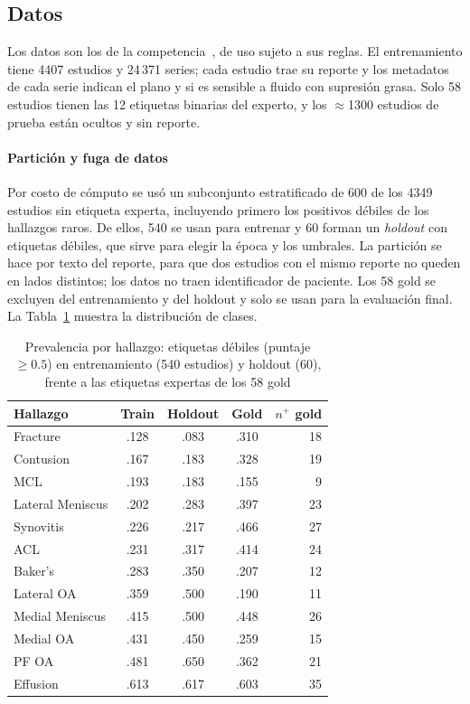 \documentclass[conference]{IEEEtran}
\begin{document}
\subsection{Datos}
\label{sec:datos}

Los datos son los de la competencia~\cite{rsna2026knee}, de uso sujeto a sus reglas.
El entrenamiento tiene 4407 estudios y 24\,371 series; cada estudio trae su reporte y los metadatos de cada serie indican el plano y si es sensible a fluido con supresión grasa.
Solo 58 estudios tienen las 12 etiquetas binarias del experto, y los $\approx$1300 estudios de prueba están ocultos y sin reporte.

\paragraph*{Partición y fuga de datos}
Por costo de cómputo se usó un subconjunto estratificado de 600 de los 4349 estudios sin etiqueta experta, incluyendo primero los positivos débiles de los hallazgos raros.
De ellos, 540 se usan para entrenar y 60 forman un \emph{holdout} con etiquetas débiles, que sirve para elegir la época y los umbrales.
La partición se hace por texto del reporte, para que dos estudios con el mismo reporte no queden en lados distintos; los datos no traen identificador de paciente.
Los 58 gold se excluyen del entrenamiento y del holdout y solo se usan para la evaluación final.
La Tabla~\ref{tab:prevalencia} muestra la distribución de clases.

\begin{table}[t]
  \caption{Prevalencia por hallazgo: etiquetas débiles (puntaje $\geq 0.5$) en entrenamiento (540 estudios) y holdout (60), frente a las etiquetas expertas de los 58 gold}
  \label{tab:prevalencia}
  \centering
  \footnotesize
  \begin{tabular}{@{}lcccr@{}}
    \toprule
    Hallazgo & Train & Holdout & Gold & $n^{+}$ gold \\
    \midrule
    Fracture         & .128 & .083 & .310 & 18 \\
    Contusion        & .167 & .183 & .328 & 19 \\
    MCL              & .193 & .183 & .155 &  9 \\
    Lateral Meniscus & .202 & .283 & .397 & 23 \\
    Synovitis        & .226 & .217 & .466 & 27 \\
    ACL              & .231 & .317 & .414 & 24 \\
    Baker's          & .283 & .350 & .207 & 12 \\
    Lateral OA       & .359 & .500 & .190 & 11 \\
    Medial Meniscus  & .415 & .500 & .448 & 26 \\
    Medial OA        & .431 & .450 & .259 & 15 \\
    PF OA            & .481 & .650 & .362 & 21 \\
    Effusion         & .613 & .617 & .603 & 35 \\
    \bottomrule
  \end{tabular}
\end{table}
\end{document}
